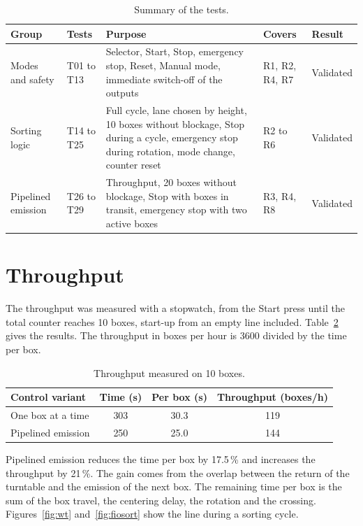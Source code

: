 \documentclass[11pt,a4paper]{report}
\begin{document}
\begin{table}[H]
\centering\small
\caption{Summary of the tests.}\label{tab:tests}
\begin{tabularx}{\linewidth}{@{}p{2.5cm}p{1.9cm}Yp{1.9cm}p{1.8cm}@{}}
\toprule
\textbf{Group} & \textbf{Tests} & \textbf{Purpose} & \textbf{Covers} & \textbf{Result}\\
\midrule
Modes and safety & T01 to T13 & Selector, Start, Stop, emergency stop, Reset, Manual mode, immediate switch-off of the outputs & R1, R2, R4, R7 & Validated\\
Sorting logic & T14 to T25 & Full cycle, lane chosen by height, 10 boxes without blockage, Stop during a cycle, emergency stop during rotation, mode change, counter reset & R2 to R6 & Validated\\
Pipelined emission & T26 to T29 & Throughput, 20 boxes without blockage, Stop with boxes in transit, emergency stop with two active boxes & R3, R4, R8 & Validated\\
\bottomrule
\end{tabularx}
\end{table}

\section{Throughput}
The throughput was measured with a stopwatch, from the Start press until the total counter reaches 10 boxes, start-up from an empty line included. Table~\ref{tab:perf} gives the results. The throughput in boxes per hour is 3600 divided by the time per box.

\begin{table}[H]
\centering\small
\caption{Throughput measured on 10 boxes.}\label{tab:perf}
\begin{tabular}{@{}lccc@{}}
\toprule
\textbf{Control variant} & \textbf{Time (s)} & \textbf{Per box (s)} & \textbf{Throughput (boxes/h)}\\
\midrule
One box at a time & 303 & 30.3 & 119\\
Pipelined emission & 250 & 25.0 & 144\\
\bottomrule
\end{tabular}
\end{table}

Pipelined emission reduces the time per box by 17.5\,\% and increases the throughput by 21\,\%. The gain comes from the overlap between the return of the turntable and the emission of the next box. The remaining time per box is the sum of the box travel, the centering delay, the rotation and the crossing. Figures~\ref{fig:wt} and~\ref{fig:fiosort} show the line during a sorting cycle.
\end{document}
